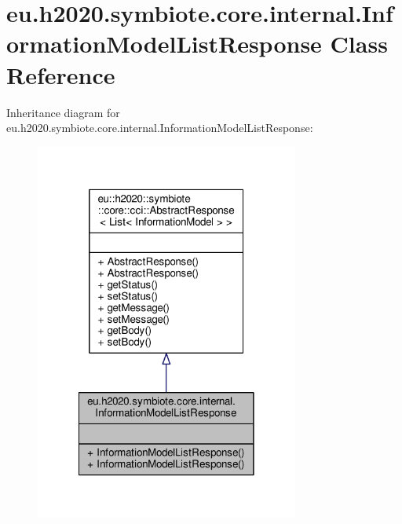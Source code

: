 \hypertarget{classeu_1_1h2020_1_1symbiote_1_1core_1_1internal_1_1InformationModelListResponse}{}\section{eu.\+h2020.\+symbiote.\+core.\+internal.\+Information\+Model\+List\+Response Class Reference}
\label{classeu_1_1h2020_1_1symbiote_1_1core_1_1internal_1_1InformationModelListResponse}


Inheritance diagram for eu.\+h2020.\+symbiote.\+core.\+internal.\+Information\+Model\+List\+Response\+:
\nopagebreak
\begin{figure}[H]
\begin{center}
\leavevmode
\includegraphics[width=246pt]{classeu_1_1h2020_1_1symbiote_1_1core_1_1internal_1_1InformationModelListResponse__inherit__graph}
\end{center}
\end{figure}


